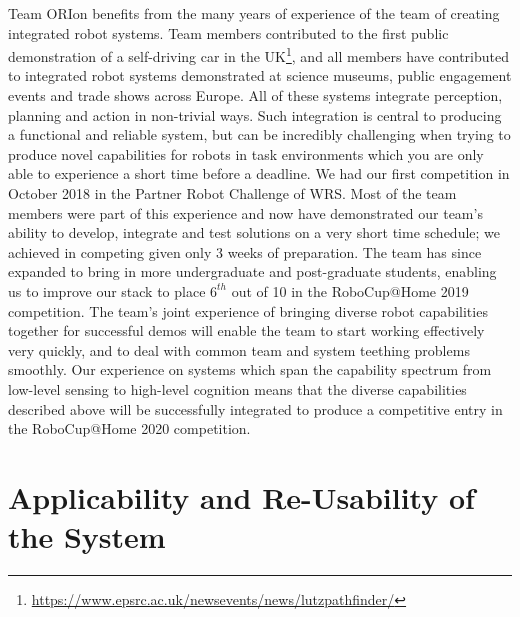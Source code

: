 \documentclass[runningheads,a4paper]{llncs}
\newcommand{\teamori}{Team ORIon}
\begin{document}
\teamori{} benefits from the many years of experience of the team of creating integrated robot systems. Team members contributed to the first public demonstration of a self-driving car in the UK\footnote{\url{https://www.epsrc.ac.uk/newsevents/news/lutzpathfinder/}}, and all members have contributed to integrated robot systems demonstrated at science museums, public engagement events and trade shows across Europe. All of these systems integrate perception, planning and action in non-trivial ways. Such integration is central to producing a functional and reliable system, but can be incredibly challenging when trying to produce novel capabilities for robots in task environments which you are only able to experience a short time before a deadline. We had our
first competition in October 2018 in the Partner Robot Challenge of WRS. 
Most of the team members were part of this experience and now have demonstrated
our team's ability to develop, integrate and test solutions on a very short
time schedule; we achieved in competing given only 3 weeks of preparation. The team has since expanded to bring in more undergraduate and post-graduate students, enabling us to improve our stack to place $6^{th}$ out of 10 in the RoboCup@Home 2019 competition.
The team's joint experience of bringing diverse robot capabilities together for successful demos will enable the team to start working effectively very quickly, and to deal with common team and system teething problems smoothly. Our experience on systems which span the capability spectrum from low-level sensing to high-level cognition means that the diverse capabilities described above will be successfully integrated to produce a competitive entry in the RoboCup@Home 2020 competition.



\section{Applicability and Re-Usability of the System}


\end{document}
